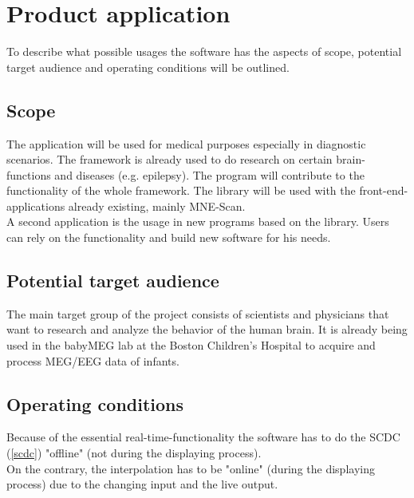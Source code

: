 \section{Product application}
To describe what possible usages the software has the aspects of scope, potential target audience and operating conditions will be outlined. 
\subsection{Scope}
The application will be used for medical purposes especially in diagnostic scenarios. The framework is already used to do research on certain brain-functions and diseases (e.g. epilepsy). The program  will contribute to the functionality of the whole framework. The library will be used with the front-end-applications already existing, mainly MNE-Scan.\\
A second application is the usage in new programs based on the library. Users can rely on the functionality and build new software for his needs.


\subsection{Potential target audience}
The main target group of the project consists of scientists and physicians that want to research and analyze the behavior of the human brain. It is already being used in the babyMEG lab at the Boston Children's Hospital to acquire and process MEG/EEG data of infants.

\subsection{Operating conditions}
Because of the essential real-time-functionality the software has to do the SCDC (\ref{scdc}) "offline" (not during the displaying process). \\
On the contrary, the interpolation has to be "online" (during the displaying process) due to the changing input and the live output.
